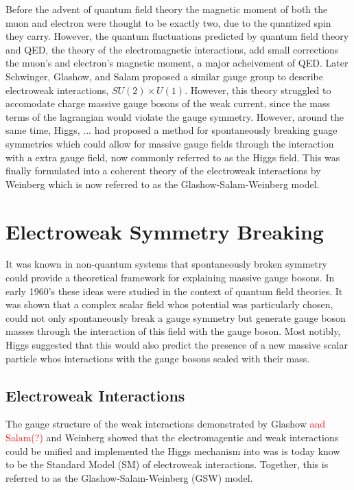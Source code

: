 Before the advent of quantum field theory the magnetic moment of both the 
muon and electron were thought to be exactly two, due to the quantized spin 
they carry.  However, the quantum fluctuations predicted by quantum field 
theory and QED, the theory of the electromagnetic interactions, add small 
corrections the muon's and electron's magnetic moment, a major acheivement 
of QED.  Later Schwinger, Glashow, and Salam proposed a similar gauge group
to describe
electroweak interactions, $SU(2)\times U(1)$.  However, this
theory struggled to accomodate charge massive gauge bosons of the weak
current, since the mass terms of
the lagrangian would violate the gauge symmetry.  However, around the same 
time, Higgs, ... had proposed a method for spontaneously breaking guage 
symmetries which could allow for massive gauge fields through the interaction
with a extra gauge field, now commonly referred to as the Higgs field.  
This was finally formulated into a coherent theory of the electroweak 
interactions by Weinberg which is now referred to as the 
Glashow-Salam-Weinberg model. 

\section{Electroweak Symmetry Breaking}
\label{sec:Electroweak Symmetry Breaking}

It was known in non-quantum systems that spontaneously broken symmetry
could provide a theoretical framework for explaining massive gauge 
bosons\cite{}. In early 1960's these ideas were studied in the context
of quantum field theories.  It was shown that a complex scalar field 
whos potential was particularly chosen, could not only spontaneously 
break a gauge symmetry but generate gauge boson masses through the 
interaction of this field with the gauge boson\cite{}.  Most notibly, 
Higgs suggested that this would also predict the presence of a new 
massive scalar particle whos interactions with the gauge bosons 
scaled with their mass\cite{}.  

\subsection{Electroweak Interactions}
\label{sec:Electroweak interactions}

The gauge structure of the weak interactions demonstrated by Glashow 
\textcolor{red}{and Salam(?)}\cite{} and Weinberg showed that the 
electromagentic and weak interactions could be unified and implemented
the Higgs mechanism into was is today know to be the Standard Model (SM)
of electroweak interactions.  Together, this is referred to as the 
Glashow-Salam-Weinberg (GSW) model.


